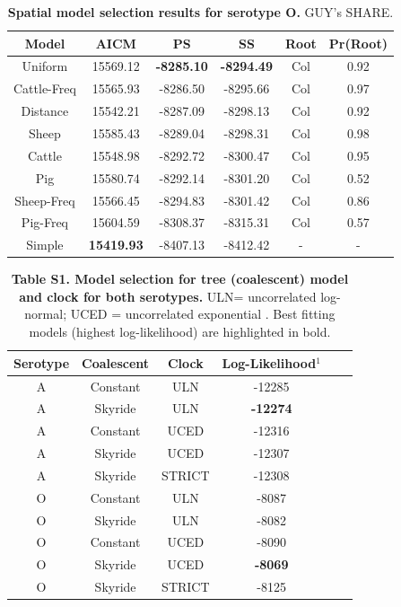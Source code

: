 \documentclass[10pt]{article}
\begin{document}
\begin{table}[!ht]
\caption{
\textbf{Spatial model selection results for serotype O. } GUY's SHARE.}
\begin{tabular}{cccccc}
\toprule
Model	&AICM	&PS	&SS	&Root	&Pr(Root)\\
\midrule
Uniform	&15569.12	&\textbf{-8285.10}	&\textbf{-8294.49}	&Col	&0.92\\
Cattle-Freq	&15565.93	&-8286.50	&-8295.66	&Col	&0.97\\
Distance	&15542.21	&-8287.09	&-8298.13	&Col	&0.92\\
Sheep	&15585.43	&-8289.04	&-8298.31	&Col	&0.98\\
Cattle	&15548.98	&-8292.72	&-8300.47	&Col	&0.95\\
Pig	&15580.74	&-8292.14	&-8301.20	&Col	&0.52\\
Sheep-Freq	&15566.45	&-8294.83	&-8301.42	&Col	&0.86\\
Pig-Freq	&15604.59	&-8308.37	&-8315.31	&Col	&0.57\\
Simple	&\textbf{15419.93}	&-8407.13	&-8412.42	&-	&-\\
\bottomrule
\end{tabular}
\begin{flushleft}
\end{flushleft}
\label{tab:prootO}
 \end{table}
\newpage
\begin{table}[!ht]
\caption*{\textbf{Table S1. Model selection for tree (coalescent) model and clock for both serotypes.}  ULN= uncorrelated log-normal; UCED = uncorrelated exponential . Best fitting models (highest log-likelihood) are highlighted in bold.}
\begin{tabular}{cccccc}
\toprule
Serotype	&Coalescent	&Clock	&Log-Likelihood$^{1}$\\
\midrule
A	&Constant	&ULN	&-12285\\
A	&Skyride 	&ULN	&\textbf{-12274}\\
A	&Constant	&UCED	&-12316\\
A	&Skyride 	&UCED	&-12307\\
A       &Skyride       &STRICT &-12308\\
O	&Constant	&ULN	&-8087\\
O	&Skyride 	&ULN	&-8082\\
O	&Constant	&UCED	&-8090\\
O	&Skyride 	&UCED	&\textbf{-8069}\\
O       &Skyride       &STRICT &-8125\\
\bottomrule
\end{tabular}
\begin{flushleft}
\end{flushleft}
\label{stab:treeclockselection}
 \end{table}
\end{document}
